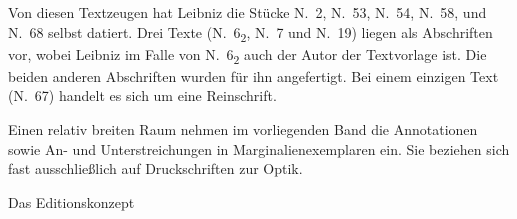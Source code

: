 Von diesen Textzeugen hat Leibniz die St\"{u}cke N.~2, N.~53, N.~54, N.~58, und N.~68 selbst datiert. Drei Texte (N.~6\textsubscript{2}, N.~7 und N.~19) liegen als Abschriften vor, wobei Leibniz im Falle von N.~6\textsubscript{2} auch der Autor der Textvorlage ist. Die beiden anderen Abschriften wurden f\"{u}r ihn angefertigt. Bei einem einzigen Text (N.~67) handelt es sich um eine Reinschrift.\par
Einen relativ breiten Raum nehmen im vorliegenden Band die Annotationen sowie An- und Unterstreichungen in Marginalienexemplaren ein. Sie beziehen sich fast ausschlie{\ss}lich auf Druckschriften zur Optik.\par\vspace{2.0ex}

Das Editionskonzept\par\vspace{1.0ex}

